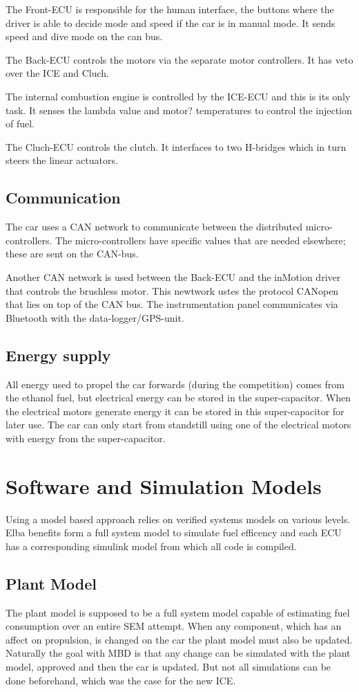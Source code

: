 The Front-ECU is responsible for the human interface, the buttons where the
driver is able to decide mode and speed if the car is in manual mode. It sends
speed and dive mode on the can bus.

The Back-ECU controls the motors via the separate motor controllers. It has
veto over the ICE and Cluch.

The internal combustion engine is controlled by the ICE-ECU and this is its
only task. It senses the lambda value and motor? temperatures to control the
injection of fuel.

The Cluch-ECU controls the clutch. It interfaces to two H-bridges which in turn
steers the linear actuators.  

\subsection{Communication}
The car uses a CAN network to communicate between the distributed
micro-controllers. The micro-controllers have specific values that are needed
elsewhere; these are sent on the CAN-bus. 

Another CAN network is used between the Back-ECU and the inMotion driver that
controls the brushless motor. This newtwork ustes the protocol CANopen that
lies on top of the CAN bus.
The instrumentation panel communicates via Bluetooth with the data-logger/GPS-unit.

\subsection{Energy supply}
All energy used to propel the car forwards (during the competition) comes from
the ethanol fuel, but electrical energy can be stored in the super-capacitor.
When the electrical motors generate energy it can be stored in this
super-capacitor for later use. The car can only start from standstill using one
of the electrical motors with energy from the super-capacitor.  


\section{Software and Simulation Models}
Using a model based approach relies on verified systems models on various levels. Elba benefits form a full system model to simulate fuel efficency and each ECU has a corresponding simulink model from which all code is compiled. 
\subsection{Plant Model}
The plant model is supposed to be a full system model capable of estimating fuel consumption over an entire SEM attempt. When any component, which has an affect on propulsion, is changed on the car the plant model must also be updated. Naturally the goal with MBD is that any change can be simulated with the plant model, approved and then the car is updated. But not all simulations can be done beforehand, which was the case for the new ICE.\@

